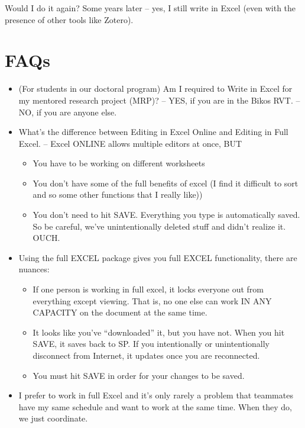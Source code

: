 \documentclass[
  english,
]{book}
\providecommand{\tightlist}{%
  \setlength{\itemsep}{0pt}\setlength{\parskip}{0pt}}
\begin{document}
Would I do it again? Some years later -- yes, I still write in Excel (even with the presence of other tools like Zotero).

\hypertarget{faqs}{%
\section{FAQs}\label{faqs}}

\begin{itemize}
\item
  (For students in our doctoral program) Am I required to Write in Excel for my mentored research project (MRP)?
  -- YES, if you are in the Bikos RVT.
  -- NO, if you are anyone else.
\item
  What's the difference between Editing in Excel Online and Editing in Full Excel.
  -- Excel ONLINE allows multiple editors at once, BUT

  \begin{itemize}
  \tightlist
  \item
    You have to be working on different worksheets
  \item
    You don't have some of the full benefits of excel (I find it difficult to sort and so some other functions that I really like))
  \item
    You don't need to hit SAVE. Everything you type is automatically saved. So be careful, we've unintentionally deleted stuff and didn't realize it. OUCH.
  \end{itemize}
\item
  Using the full EXCEL package gives you full EXCEL functionality, there are nuances:

  \begin{itemize}
  \tightlist
  \item
    If one person is working in full excel, it locks everyone out from everything except viewing. That is, no one else can work IN ANY CAPACITY on the document at the same time.
  \item
    It looks like you've ``downloaded'' it, but you have not. When you hit SAVE, it saves back to SP. If you intentionally or unintentionally disconnect from Internet, it updates once you are reconnected.
  \item
    You must hit SAVE in order for your changes to be saved.
  \end{itemize}
\item
  I prefer to work in full Excel and it's only rarely a problem that teammates have my same schedule and want to work at the same time. When they do, we just coordinate.
\end{itemize}
\end{document}

